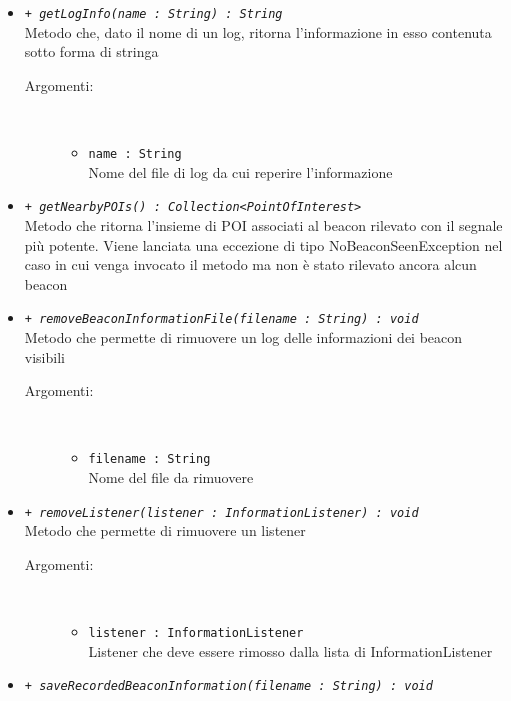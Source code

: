 \documentclass[../DefinizioneDiProdotto.tex]{subfiles}
\begin{document}
\begin{description}
\begin{itemize}
		\item \texttt{+ \textit{getLogInfo(name : String) : String}}\\
		Metodo che, dato il nome di un log, ritorna l'informazione in esso contenuta sotto forma di stringa
		\begin{description}
			\item[Argomenti:] \
			\begin{itemize}
				\item \texttt{name : String}\\
				Nome del file di log da cui reperire l'informazione\end{itemize}
		\end{description}
		\item \texttt{+ \textit{getNearbyPOIs() : Collection<PointOfInterest>}}\\
		Metodo che ritorna l'insieme di POI associati al beacon rilevato con il segnale più potente. Viene lanciata una eccezione di tipo NoBeaconSeenException nel caso in cui venga invocato il metodo ma non è stato rilevato ancora alcun beacon
		\item \texttt{+ \textit{removeBeaconInformationFile(filename : String) : void}}\\
		Metodo che permette di rimuovere un log delle informazioni dei beacon visibili
		\begin{description}
			\item[Argomenti:] \
			\begin{itemize}
				\item \texttt{filename : String}\\
				Nome del file da rimuovere\end{itemize}
		\end{description}
		\item \texttt{+ \textit{removeListener(listener : InformationListener) : void}}\\
		Metodo che permette di rimuovere un listener
		\begin{description}
			\item[Argomenti:] \
			\begin{itemize}
				\item \texttt{listener : InformationListener}\\
				Listener che deve essere rimosso dalla lista di InformationListener\end{itemize}
		\end{description}
		\item \texttt{+ \textit{saveRecordedBeaconInformation(filename : String) : void}}\\

\end{itemize}
\end{description}
\end{document}

